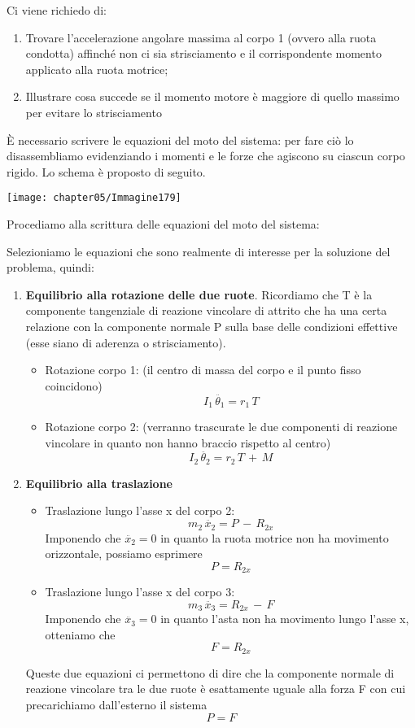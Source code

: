 Ci viene richiedo di:
\begin{enumerate}
\item Trovare l'accelerazione angolare massima al corpo 1 (ovvero alla ruota condotta) affinché non ci sia strisciamento e il corrispondente momento applicato alla ruota motrice;
\item Illustrare cosa succede se il momento motore è maggiore di quello massimo per evitare lo strisciamento
\end{enumerate}

È necessario scrivere le equazioni del moto del sistema: per fare ciò lo disassembliamo evidenziando i momenti e le forze che agiscono su ciascun corpo rigido. Lo schema è proposto di seguito.
\begin{center}
\texttt{[image: chapter05/Immagine179]}
\end{center}

Procediamo alla scrittura delle equazioni del moto del sistema:

Selezioniamo le equazioni che sono realmente di interesse per la soluzione del problema, quindi:
\begin{enumerate}
\item \textbf{Equilibrio alla rotazione delle due ruote}. Ricordiamo che T è la componente tangenziale di reazione vincolare di attrito che ha una certa relazione con la componente normale P sulla base delle condizioni effettive (esse siano di aderenza o strisciamento).
\begin{itemize}
\item Rotazione corpo 1: (il centro di massa del corpo e il punto fisso coincidono)
\[I_1\,\ddot{\theta_1} = r_1\,T\]
\item Rotazione corpo 2: (verranno trascurate le due componenti di reazione vincolare in quanto non hanno braccio rispetto al centro)
\[I_2\,\ddot{\theta_2} = r_2\,T\,+\,M\]
\end{itemize}
\item \textbf{Equilibrio alla traslazione}
\begin{itemize}
\item Traslazione lungo l'asse x del corpo 2:
\[m_2\,\ddot{x_2} = P\,-\,R_{2x}\]
Imponendo che $\ddot{x_2} = 0$ in quanto la ruota motrice non ha movimento orizzontale, possiamo esprimere 
\[P = R_{2x}\]
\item Traslazione lungo l'asse x del corpo 3:
\[m_3\,\ddot{x_3} = R_{2x}\,-\,F\]
Imponendo che $\ddot{x_3} = 0$ in quanto l'asta non ha movimento lungo l'asse x, otteniamo che
\[F = R_{2x}\]
\end{itemize}
Queste due equazioni ci permettono di dire che la componente normale di reazione vincolare tra le due ruote è esattamente uguale alla forza F con cui precarichiamo dall'esterno il sistema
\[P = F\]
\end{enumerate}

